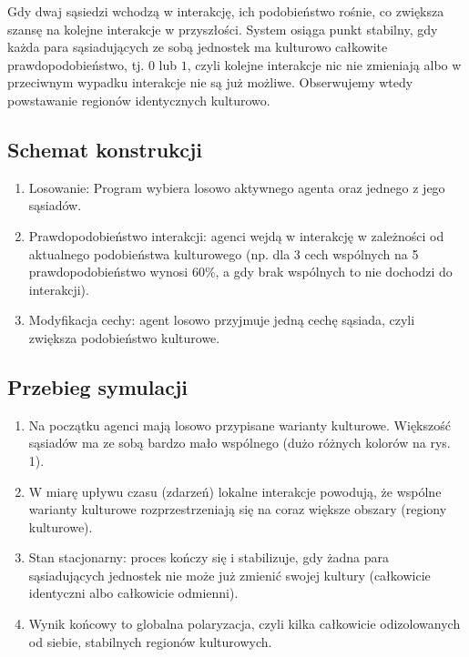 \documentclass[polish,11pt,a4paper]{article}
\begin{document}
	Gdy dwaj sąsiedzi wchodzą w interakcję, ich podobieństwo rośnie, 
	co zwiększa szansę na kolejne interakcje w przyszłości.
	System osiąga punkt stabilny, gdy każda para sąsiadujących ze 
	sobą jednostek ma kulturowo całkowite prawdopodobieństwo, tj. \(0\) lub \(1\),
	czyli kolejne interakcje nic nie zmieniają albo w przeciwnym wypadku interakcje
	 nie są już możliwe. Obserwujemy wtedy powstawanie regionów identycznych kulturowo.

	\subsection{Schemat konstrukcji}
	\begin{enumerate}
		\item Losowanie: Program wybiera losowo aktywnego agenta oraz jednego z jego sąsiadów.
		\item Prawdopodobieństwo interakcji: agenci wejdą w interakcję w zależności 
		od aktualnego podobieństwa kulturowego (np. dla 3 cech wspólnych na 5 prawdopodobieństwo wynosi 60\%, a gdy brak wspólnych to nie dochodzi do interakcji).
		\item Modyfikacja cechy: agent losowo przyjmuje jedną cechę sąsiada, czyli zwiększa podobieństwo kulturowe.
	\end{enumerate}

	\subsection{Przebieg symulacji}
	\begin{enumerate}
		\item Na początku agenci mają losowo przypisane warianty kulturowe. 
		Większość sąsiadów ma ze sobą bardzo mało wspólnego (dużo różnych kolorów na rys. 1).
		\item W miarę upływu czasu (zdarzeń) lokalne interakcje powodują, że wspólne warianty kulturowe 
		rozprzestrzeniają się na coraz większe obszary (regiony kulturowe).
		\item Stan stacjonarny: proces kończy się i stabilizuje, gdy żadna para sąsiadujących jednostek 
		nie może już zmienić swojej kultury (całkowicie identyczni albo całkowicie odmienni).
		\item Wynik końcowy to globalna polaryzacja, czyli kilka całkowicie odizolowanych od siebie, 
		stabilnych regionów kulturowych.  
	\end{enumerate}
\end{document}
